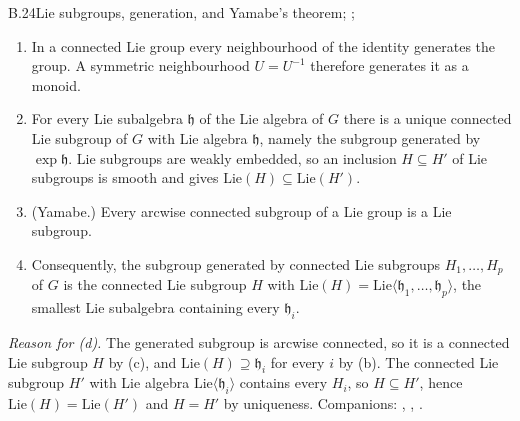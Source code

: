 \begin{auxresult}{B.24}{Lie subgroups, generation, and Yamabe's theorem}{\citep[Prop.~7.14, Thms~19.25,
19.26]{xlee2013introduction}; \citep{xyamabe1950arcwise}; \citep{xgoto1969arcwise}}
\begin{enumerate}[label=(\alph*)]
  \item In a connected Lie group every neighbourhood of the identity generates the group. A symmetric neighbourhood
    $U=U^{-1}$ therefore generates it as a monoid.
  \item For every Lie subalgebra $\mathfrak h$ of the Lie algebra of $G$ there is a unique connected Lie subgroup of $G$
    with Lie algebra $\mathfrak h$, namely the subgroup generated by $\exp\mathfrak h$. Lie subgroups are weakly
    embedded, so an inclusion $H\subseteq H'$ of Lie subgroups is smooth and gives $\mathrm{Lie}(H)\subseteq\mathrm{Lie}(H')$.
  \item (Yamabe.) Every arcwise connected subgroup of a Lie group is a Lie subgroup.
  \item Consequently, the subgroup generated by connected Lie subgroups $H_1,\dots,H_p$ of $G$ is the connected Lie
    subgroup $H$ with $\mathrm{Lie}(H)=\mathrm{Lie}\langle\mathfrak h_1,\dots,\mathfrak h_p\rangle$, the smallest Lie
    subalgebra containing every $\mathfrak h_i$.
\end{enumerate}
\end{auxresult}
\noindent\emph{Reason for (d).} The generated subgroup is arcwise connected, so it is a connected Lie subgroup $H$ by (c),
and $\mathrm{Lie}(H)\supseteq\mathfrak h_i$ for every $i$ by (b). The connected Lie subgroup $H'$ with Lie algebra
$\mathrm{Lie}\langle\mathfrak h_i\rangle$ contains every $H_i$, so $H\subseteq H'$, hence
$\mathrm{Lie}(H)=\mathrm{Lie}(H')$ and $H=H'$ by uniqueness. Companions: , , .

